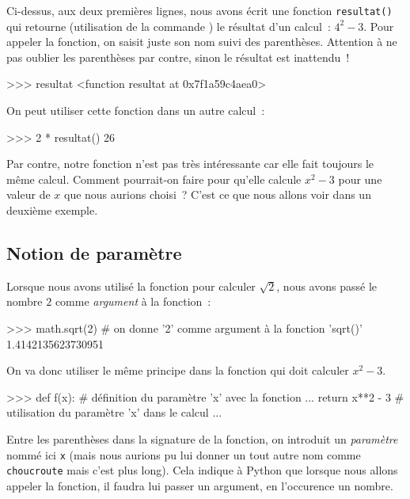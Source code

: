 Ci-dessus, aux deux premières lignes, nous avons écrit une fonction \texttt{resultat()}
qui retourne (utilisation de la commande ) le résultat d'un calcul~: $4^2-3$.
Pour appeler la fonction, on saisit juste son nom
suivi des parenthèses. Attention à ne pas oublier les parenthèses par contre, sinon le résultat
est inattendu~!

\begin{pythoncode}
>>> resultat
<function resultat at 0x7f1a59c4aea0>
\end{pythoncode}

On peut utiliser cette fonction dans un autre calcul~:

\begin{pythoncode}
>>> 2 * resultat()
26
\end{pythoncode}

Par contre, notre fonction n'est pas très intéressante car elle fait toujours le même calcul.
Comment pourrait-on faire pour qu'elle calcule $x^2-3$ pour une valeur de $x$ que nous aurions
choisi~? C'est ce que nous allons voir dans un deuxième exemple.

\subsection{Notion de paramètre}
Lorsque nous avons utilisé la fonction  pour calculer $\sqrt{2}$, nous avons
passé le nombre $2$ comme \textit{argument} à la fonction~:

\begin{pythoncode}
>>> math.sqrt(2)              # on donne '2' comme argument à la fonction 'sqrt()'
1.4142135623730951
\end{pythoncode}

On va donc utiliser le même principe dans la fonction qui doit calculer $x^2-3$.

\begin{pythoncode}
>>> def f(x):                 # définition du paramètre 'x' avec la fonction
...     return x**2 - 3        # utilisation du paramètre 'x' dans le calcul
...
\end{pythoncode}

Entre les parenthèses dans la signature de la fonction, on introduit un \textit{paramètre}
 nommé
ici \texttt{x} (mais nous aurions pu lui donner un tout autre nom comme \texttt{choucroute} mais
c'est plus long). Cela indique à Python que lorsque nous allons appeler la fonction, il faudra lui
passer un argument, en l'occurence un nombre.

